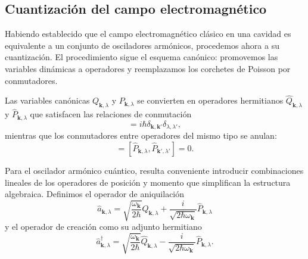     \subsection{Cuantización del campo electromagnético}

        Habiendo establecido que el campo electromagnético clásico en una cavidad es equivalente a un conjunto de osciladores armónicos, procedemos ahora a su cuantización. El procedimiento sigue el esquema canónico: promovemos las variables dinámicas a operadores y reemplazamos los corchetes de Poisson por conmutadores.

        Las variables canónicas $Q_{\mathbf{k},\lambda}$ y $P_{\mathbf{k},\lambda}$ se convierten en operadores hermitianos $\hat{Q}_{\mathbf{k},\lambda}$ y $\hat{P}_{\mathbf{k},\lambda}$ que satisfacen las relaciones de conmutación
        \begin{equation}
            [\hat{Q}_{\mathbf{k},\lambda}, \hat{P}_{\mathbf{k}',\lambda'}] = i\hbar \delta_{\mathbf{k},\mathbf{k}'}\delta_{\lambda,\lambda'},
        \end{equation}
        mientras que los conmutadores entre operadores del mismo tipo se anulan:
        \begin{equation}
            [\hat{Q}_{\mathbf{k},\lambda}, \hat{Q}_{\mathbf{k}',\lambda'}] = [\hat{P}_{\mathbf{k},\lambda}, \hat{P}_{\mathbf{k}',\lambda'}] = 0.
        \end{equation}

        Para el oscilador armónico cuántico, resulta conveniente introducir combinaciones lineales de los operadores de posición y momento que simplifican la estructura algebraica. Definimos el operador de aniquilación
        \begin{equation}
            \hat{a}_{\mathbf{k},\lambda} = \sqrt{\frac{\omega_{\mathbf{k}}}{2\hbar}}\hat{Q}_{\mathbf{k},\lambda} + \frac{i}{\sqrt{2\hbar\omega_{\mathbf{k}}}}\hat{P}_{\mathbf{k},\lambda}
        \end{equation}
        y el operador de creación como su adjunto hermitiano
        \begin{equation}
            \hat{a}^\dagger_{\mathbf{k},\lambda} = \sqrt{\frac{\omega_{\mathbf{k}}}{2\hbar}}\hat{Q}_{\mathbf{k},\lambda} - \frac{i}{\sqrt{2\hbar\omega_{\mathbf{k}}}}\hat{P}_{\mathbf{k},\lambda}.
        \end{equation}
        
